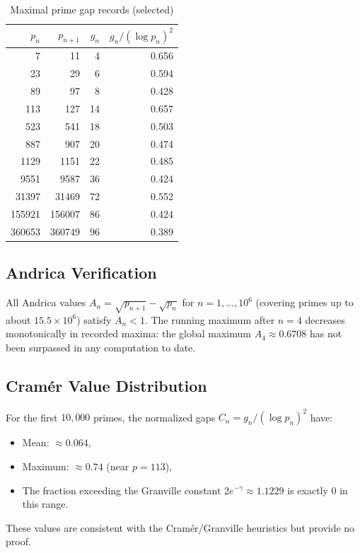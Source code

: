 \documentclass[12pt,a4paper]{amsart}
\theoremstyle{definition}
\begin{document}
\begin{table}[h]
\centering
\caption{Maximal prime gap records (selected)}
\begin{tabular}{@{}rrrr@{}}
\toprule
$p_n$ & $p_{n+1}$ & $g_n$ & $g_n/(\log p_n)^2$ \\
\midrule
7 & 11 & 4 & 0.656 \\
23 & 29 & 6 & 0.594 \\
89 & 97 & 8 & 0.428 \\
113 & 127 & 14 & 0.657 \\
523 & 541 & 18 & 0.503 \\
887 & 907 & 20 & 0.474 \\
1129 & 1151 & 22 & 0.485 \\
9551 & 9587 & 36 & 0.424 \\
31397 & 31469 & 72 & 0.552 \\
155921 & 156007 & 86 & 0.424 \\
360653 & 360749 & 96 & 0.389 \\
\bottomrule
\end{tabular}
\end{table}

\subsection{Andrica Verification}

All Andrica values $A_n = \sqrt{p_{n+1}} - \sqrt{p_n}$ for $n = 1, \ldots,
10^6$ (covering primes up to about $15.5 \times 10^6$) satisfy $A_n < 1$.
The running maximum after $n = 4$ decreases monotonically in recorded maxima:
the global maximum $A_4 \approx 0.6708$ has not been surpassed in any
computation to date.

\subsection{Cram\'{e}r Value Distribution}

For the first $10{,}000$ primes, the normalized gaps $C_n = g_n/(\log p_n)^2$
have:
\begin{itemize}
  \item Mean: $\approx 0.064$,
  \item Maximum: $\approx 0.74$ (near $p = 113$),
  \item The fraction exceeding the Granville constant $2e^{-\gamma} \approx
        1.1229$ is exactly $0$ in this range.
\end{itemize}

These values are consistent with the Cram\'{e}r/Granville heuristics but provide
no proof.
\end{document}
